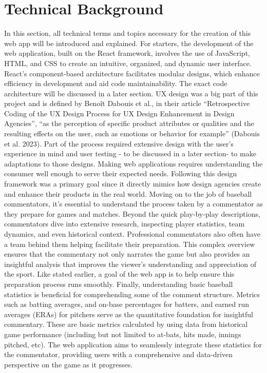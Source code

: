 \documentclass[10pt,twocolumn]{article}
\begin{document}
\section{Technical Background}

In this section, all technical terms and topics necessary for the creation of this web app will be introduced and explained. \break\break
For starters, the development of the web application, built on the React framework, involves the use of JavaScript, HTML, and CSS to create an intuitive, organized, and dynamic user interface. React's component-based architecture facilitates modular designs, which enhance efficiency in development and aid code maintainability. The exact code architecture will be discussed in a later section. \break
\indent UX design was a big part of this project and is defined by Benoît Dabouis et al., in their article “Retrospective Coding of the UX Design Process for UX Design Enhancement in Design Agencies”, “as the perception of specific product attributes or qualities and the resulting effects on the user, such as emotions or behavior for example” (Dabouis et al. 2023). \cite{uxdesign} Part of the process required extensive design with the user's experience in mind and user testing - to be discussed in a later section- to make adaptations to those designs. Making web applications requires understanding the consumer well enough to serve their expected needs. Following this design framework was a primary goal since it directly mimics how design agencies create and enhance their products in the real world.
Moving on to the job of baseball commentators, it's essential to understand the process taken by a commentator as they prepare for games and matches. Beyond the quick play-by-play descriptions, commentators dive into extensive research, inspecting player statistics, team dynamics, and even historical context. Professional commentators also often have a team behind them helping facilitate their preparation. This complex overview ensures that the commentary not only narrates the game but also provides an insightful analysis that improves the viewer's understanding and appreciation of the sport. Like stated earlier, a goal of the web app is to help ensure this preparation process runs smoothly. \break
\indent Finally, understanding basic baseball statistics is beneficial for comprehending some of the comment structure. Metrics such as batting averages, and on-base percentages for batters, and earned run averages (ERAs) for pitchers serve as the quantitative foundation for insightful commentary. These are basic metrics calculated by using data from historical game performance (including but not limited to at-bats, hits made, innings pitched, etc). The web application aims to seamlessly integrate these statistics for the commentator, providing users with a comprehensive and data-driven perspective on the game as it progresses. 
\end{document}
